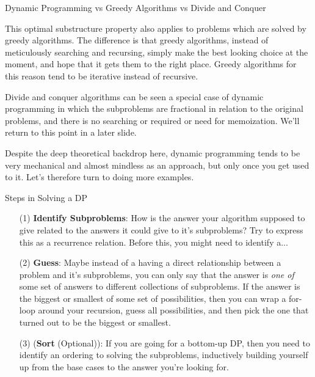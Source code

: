 \documentclass{beamer}
\begin{document}
\begin{frame}{Dynamic Programming vs Greedy Algorithms vs Divide and Conquer}
    \begin{itemize}
        {\small \item This optimal substructure property also applies to problems which are solved by greedy algorithms. The difference is that greedy algorithms, instead of meticulously searching and recursing, simply make the best looking choice at the moment, and hope that it gets them to the right place. Greedy algorithms for this reason tend to be iterative instead of recursive. 
        \item Divide and conquer algorithms can be seen a special case of dynamic programming in which the subproblems are fractional in relation to the original problems, and there is no searching or required or need for memoization. We'll return to this point in a later slide.
        \item Despite the deep theoretical backdrop here, dynamic programming tends to be very mechanical and almost mindless as an approach, but only once you get used to it. Let's therefore turn to doing more examples.} 
    \end{itemize}
\end{frame}

\begin{frame}{Steps in Solving a DP}
    \begin{itemize}
        \item[(1)] \textbf{Identify Subproblems}: How is the answer your algorithm supposed to give related to the answers it could give to it's subproblems? Try to express this as a recurrence relation. Before this, you might need to identify a... \pause 
        \item[(2)] \textbf{Guess}: Maybe instead of a having a direct relationship between a problem and it's subproblems, you can only say that the answer is \emph{one of} some set of answers to different collections of subproblems. If the answer is the biggest or smallest of some set of possibilities, then you can wrap a for-loop around your recursion, guess all possibilities, and then pick the one that turned out to be the biggest or smallest.
        \item[(3)] (\textbf{Sort} (Optional)): If you are going for a bottom-up DP, then you need to identify an ordering to solving the subproblems, inductively building yourself up from the base cases to the answer you're looking for. 
    \end{itemize}
\end{frame}
\end{document}
